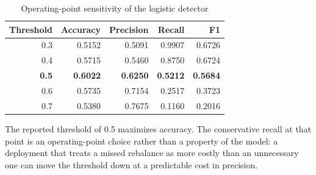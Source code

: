 \begin{table}[t]
\caption{Operating-point sensitivity of the logistic detector}
\label{tab:t13}
\centering
\footnotesize
\begin{tabular}{@{}rrrrr@{}}
\toprule
Threshold & Accuracy & Precision & Recall & F1 \\
\midrule
0.3 & 0.5152 & 0.5091 & 0.9907 & 0.6726 \\
0.4 & 0.5715 & 0.5460 & 0.8750 & 0.6724 \\
\textbf{0.5} & \textbf{0.6022} & \textbf{0.6250} & \textbf{0.5212} & \textbf{0.5684} \\
0.6 & 0.5735 & 0.7154 & 0.2517 & 0.3723 \\
0.7 & 0.5380 & 0.7675 & 0.1160 & 0.2016 \\
\bottomrule
\end{tabular}

\vspace{0.5mm}
\raggedright\footnotesize
The reported threshold of 0.5 maximizes accuracy. The conservative recall at that
point is an operating-point choice rather than a property of the model: a
deployment that treats a missed rebalance as more costly than an unnecessary one
can move the threshold down at a predictable cost in precision.
\end{table}
